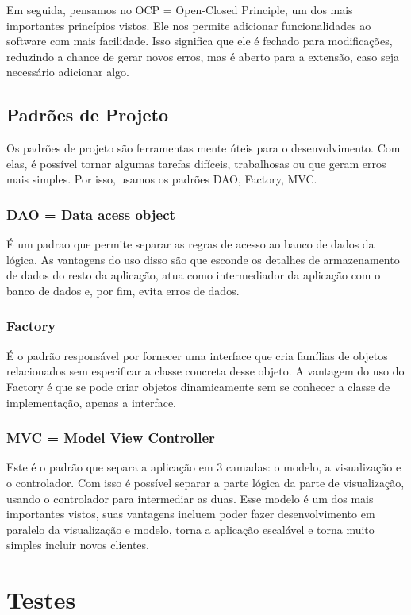 \documentclass[12pt]{article}
\begin{document}
			Em seguida, pensamos no OCP = Open-Closed Principle, um dos mais importantes princípios vistos. Ele nos permite adicionar funcionalidades ao software com mais facilidade. Isso significa que ele é fechado para modificações, reduzindo a chance de gerar novos erros, mas é aberto para a extensão, caso seja necessário adicionar algo.

		\subsection{Padrões de Projeto}

			Os padrões de projeto são ferramentas mente úteis para o desenvolvimento. Com elas, é possível tornar algumas tarefas difíceis, trabalhosas ou que geram erros mais simples. Por isso, usamos os padrões DAO, Factory, MVC.

			\subsubsection{DAO = Data acess object} É um padrao que permite separar as regras de acesso ao banco de dados da lógica. As vantagens do uso disso são que esconde os detalhes de armazenamento de dados do resto da aplicação, atua como intermediador da aplicação com o banco de dados e, por fim, evita erros de dados.

			\subsubsection{Factory} É o padrão responsável por fornecer uma interface que cria famílias de objetos relacionados sem especificar a classe concreta desse objeto. A vantagem do uso do Factory é que se pode criar objetos dinamicamente sem se conhecer a classe de implementação, apenas a interface.

			\subsubsection{MVC = Model View Controller} Este é o padrão que separa a aplicação em 3 camadas: o modelo, a visualização e o controlador. Com isso é possível separar a parte lógica da parte de visualização, usando o controlador para intermediar as duas. Esse modelo é um dos mais importantes vistos, suas vantagens incluem poder fazer desenvolvimento em paralelo da visualização e modelo, torna a aplicação escalável e torna muito simples incluir novos clientes.

	\section{Testes}
\end{document}
